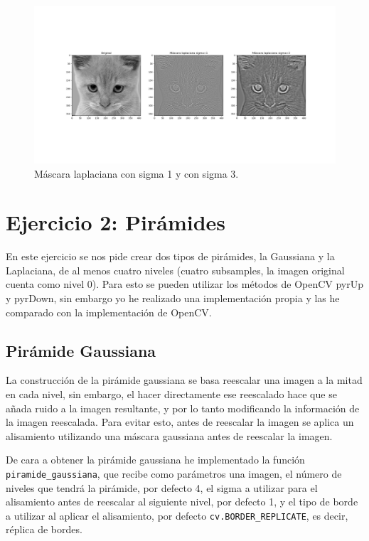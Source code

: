\documentclass[12pt, spanish]{article}
\begin{document}
\begin{figure}[H]
  \centering
      \includegraphics[width=\textwidth]{ej1d.png}
 		 \caption{Máscara laplaciana con sigma 1 y con sigma 3.}
  		\label{fig:ej1d}

\end{figure}



\section{Ejercicio 2: Pirámides}

En este ejercicio se nos pide crear dos tipos de pirámides, la Gaussiana y la Laplaciana, de al menos cuatro niveles (cuatro subsamples, la imagen original cuenta como nivel 0). Para esto se pueden utilizar los métodos de OpenCV pyrUp\cite{pyrUpCV} y pyrDown\cite{pyrDownCV}, sin embargo yo he realizado una implementación propia y las he comparado con la implementación de OpenCV.

\subsection{Pirámide Gaussiana}

La construcción de la pirámide gaussiana se basa reescalar una imagen a la mitad en cada nivel, sin embargo, el hacer directamente ese reescalado hace que se añada ruido a la imagen resultante, y por lo tanto modificando la información de la imagen reescalada. Para evitar esto, antes de reescalar la imagen se aplica un alisamiento utilizando una máscara gaussiana antes de reescalar la imagen.

De cara a obtener la pirámide gaussiana he implementado la función \texttt{piramide\_gaussiana}, que recibe como parámetros una imagen, el número de niveles que tendrá la pirámide, por defecto 4, el sigma a utilizar para el alisamiento antes de reescalar al siguiente nivel, por defecto 1, y el tipo de borde a utilizar al aplicar el alisamiento, por defecto \texttt{cv.BORDER\_REPLICATE}, es decir, réplica de bordes.
\end{document}
